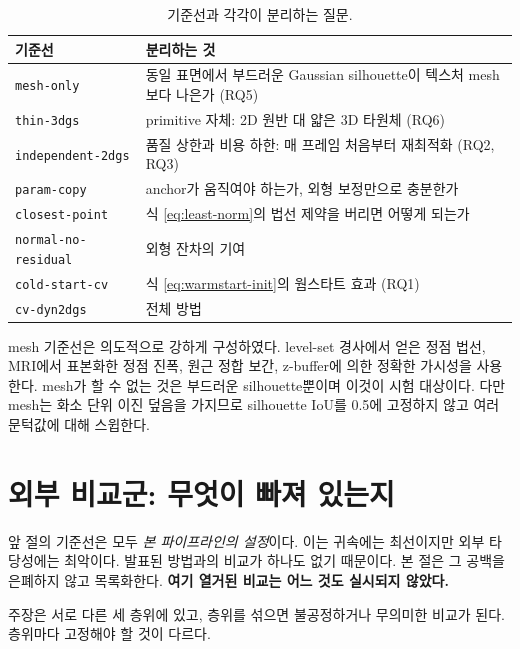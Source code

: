 \begin{table}[htbp]
\centering
\small
\caption{기준선과 각각이 분리하는 질문.}
\label{tab:baselines}
\begin{tabular}{@{}lp{9.0cm}@{}}
\toprule
기준선 & 분리하는 것 \\
\midrule
\texttt{mesh-only} & 동일 표면에서 부드러운 Gaussian silhouette이 텍스처 mesh보다
  나은가 (RQ5) \\
\texttt{thin-3dgs} & primitive 자체: 2D 원반 대 얇은 3D 타원체 (RQ6) \\
\texttt{independent-2dgs} & 품질 상한과 비용 하한: 매 프레임 처음부터 재최적화 (RQ2, RQ3) \\
\texttt{param-copy} & anchor가 움직여야 하는가, 외형 보정만으로 충분한가 \\
\texttt{closest-point} & 식 \eqref{eq:least-norm}의 법선 제약을 버리면 어떻게 되는가 \\
\texttt{normal-no-residual} & 외형 잔차의 기여 \\
\texttt{cold-start-cv} & 식 \eqref{eq:warmstart-init}의 웜스타트 효과 (RQ1) \\
\texttt{cv-dyn2dgs} & 전체 방법 \\
\bottomrule
\end{tabular}
\end{table}

mesh 기준선은 의도적으로 강하게 구성하였다. level-set 경사에서 얻은 정점 법선,
MRI에서 표본화한 정점 진폭, 원근 정합 보간, z-buffer에 의한 정확한 가시성을 사용한다.
mesh가 할 수 없는 것은 부드러운 silhouette뿐이며 이것이 시험 대상이다. 다만 mesh는
화소 단위 이진 덮음을 가지므로 silhouette IoU를 0.5에 고정하지 않고 여러 문턱값에
대해 스윕한다.

\section{외부 비교군: 무엇이 빠져 있는지}
\label{sec:external-baselines}

앞 절의 기준선은 모두 \emph{본 파이프라인의 설정}이다. 이는 귀속에는 최선이지만
외부 타당성에는 최악이다. 발표된 방법과의 비교가 하나도 없기 때문이다. 본 절은 그
공백을 은폐하지 않고 목록화한다. \textbf{여기 열거된 비교는 어느 것도 실시되지
않았다.}

주장은 서로 다른 세 층위에 있고, 층위를 섞으면 불공정하거나 무의미한 비교가 된다.
층위마다 고정해야 할 것이 다르다.

